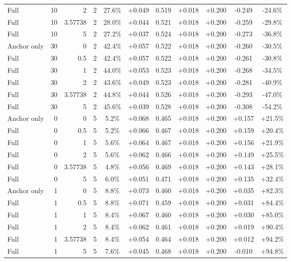 \begin{table}[htbp]
\begin{tabular}{lrrrccccccc}
Full & 10 & 2 & 2 & 27.6\% & +0.049 & 0.519 & +0.018 & +0.200 & -0.249 & -24.6\% \\
Full & 10 & 3.57738 & 2 & 28.0\% & +0.044 & 0.521 & +0.018 & +0.200 & -0.259 & -29.8\% \\
Full & 10 & 5 & 2 & 27.2\% & +0.037 & 0.524 & +0.018 & +0.200 & -0.273 & -36.8\% \\
Anchor only & 30 & 0 & 2 & 42.4\% & +0.057 & 0.522 & +0.018 & +0.200 & -0.260 & -30.5\% \\
Full & 30 & 0.5 & 2 & 42.4\% & +0.057 & 0.522 & +0.018 & +0.200 & -0.261 & -30.8\% \\
Full & 30 & 1 & 2 & 44.0\% & +0.053 & 0.523 & +0.018 & +0.200 & -0.268 & -34.5\% \\
Full & 30 & 2 & 2 & 43.6\% & +0.049 & 0.523 & +0.018 & +0.200 & -0.281 & -40.9\% \\
Full & 30 & 3.57738 & 2 & 44.8\% & +0.044 & 0.526 & +0.018 & +0.200 & -0.293 & -47.0\% \\
Full & 30 & 5 & 2 & 45.6\% & +0.039 & 0.528 & +0.018 & +0.200 & -0.308 & -54.2\% \\
Anchor only & 0 & 0 & 5 & 5.2\% & +0.068 & 0.465 & +0.018 & +0.200 & +0.157 & +21.5\% \\
Full & 0 & 0.5 & 5 & 5.2\% & +0.066 & 0.467 & +0.018 & +0.200 & +0.159 & +20.4\% \\
Full & 0 & 1 & 5 & 5.6\% & +0.064 & 0.467 & +0.018 & +0.200 & +0.156 & +21.9\% \\
Full & 0 & 2 & 5 & 5.6\% & +0.062 & 0.466 & +0.018 & +0.200 & +0.149 & +25.5\% \\
Full & 0 & 3.57738 & 5 & 4.8\% & +0.056 & 0.469 & +0.018 & +0.200 & +0.143 & +28.1\% \\
Full & 0 & 5 & 5 & 6.0\% & +0.051 & 0.471 & +0.018 & +0.200 & +0.135 & +32.4\% \\
Anchor only & 1 & 0 & 5 & 8.8\% & +0.073 & 0.460 & +0.018 & +0.200 & +0.035 & +82.3\% \\
Full & 1 & 0.5 & 5 & 8.8\% & +0.071 & 0.459 & +0.018 & +0.200 & +0.031 & +84.4\% \\
Full & 1 & 1 & 5 & 8.4\% & +0.067 & 0.460 & +0.018 & +0.200 & +0.030 & +85.0\% \\
Full & 1 & 2 & 5 & 8.4\% & +0.062 & 0.461 & +0.018 & +0.200 & +0.019 & +90.4\% \\
Full & 1 & 3.57738 & 5 & 8.4\% & +0.054 & 0.464 & +0.018 & +0.200 & +0.012 & +94.2\% \\
Full & 1 & 5 & 5 & 7.6\% & +0.045 & 0.468 & +0.018 & +0.200 & -0.010 & +94.8\% \\

\end{tabular}
\end{table}
